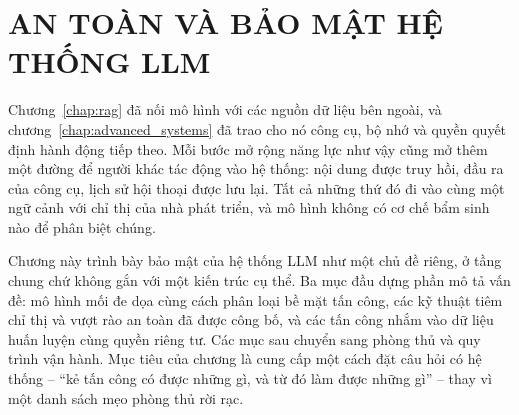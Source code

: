 
\chapter{AN TOÀN VÀ BẢO MẬT HỆ THỐNG LLM}
\label{chap:security}

Chương~\ref{chap:rag} đã nối mô hình với các nguồn dữ liệu bên ngoài, và chương~\ref{chap:advanced_systems} đã trao cho nó công cụ, bộ nhớ và quyền quyết định hành động tiếp theo. Mỗi bước mở rộng năng lực như vậy cũng mở thêm một đường để người khác tác động vào hệ thống: nội dung được truy hồi, đầu ra của công cụ, lịch sử hội thoại được lưu lại. Tất cả những thứ đó đi vào cùng một ngữ cảnh với chỉ thị của nhà phát triển, và mô hình không có cơ chế bẩm sinh nào để phân biệt chúng.

Chương này trình bày bảo mật của hệ thống LLM như một chủ đề riêng, ở tầng chung chứ không gắn với một kiến trúc cụ thể. Ba mục đầu dựng phần mô tả vấn đề: mô hình mối đe dọa cùng cách phân loại bề mặt tấn công, các kỹ thuật tiêm chỉ thị và vượt rào an toàn đã được công bố, và các tấn công nhắm vào dữ liệu huấn luyện cùng quyền riêng tư. Các mục sau chuyển sang phòng thủ và quy trình vận hành. Mục tiêu của chương là cung cấp một cách đặt câu hỏi có hệ thống -- ``kẻ tấn công có được những gì, và từ đó làm được những gì'' -- thay vì một danh sách mẹo phòng thủ rời rạc.
